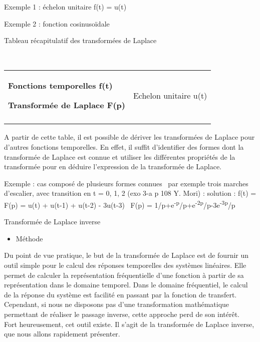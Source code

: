 \documentclass[]{article}
\begin{document}
Exemple 1 : échelon unitaire f(t) = u(t)

Exemple 2 : fonction cosinusoïdale

Tableau récapitulatif des transformées de Laplace

~~ ~ ~

\begin{longtable}[c]{@{}ll@{}}
\toprule\addlinespace
\begin{minipage}[t]{0.47\columnwidth}\raggedright
\textbf{Fonctions temporelles f(t)}

\textbf{Transformée de Laplace F(p)}
\end{minipage} & \begin{minipage}[t]{0.47\columnwidth}\raggedright
Echelon unitaire u(t)
\end{minipage}
\\\addlinespace
\bottomrule
\end{longtable}

A partir de cette table, il est possible de dériver les transformées de
Laplace pour d'autres fonctions temporelles. En effet, il suffit
d'identifier des formes dont la transformée de Laplace est connue et
utiliser les différentes propriétés de la transformée pour en déduire
l'expression de la transformée de Laplace.

Exemple : cas composé de plusieurs formes connues~ par exemple trois
marches d'escalier, avec transition en t = 0, 1, 2 (exo 3-a p 108 Y.
Mori) : solution : f(t) = F(p) = u(t) + u(t-1) + u(t-2) - 3u(t-3)~ F(p)
=
1/p+e\textsuperscript{-p}/p+e\textsuperscript{-2p}/p-3e\textsuperscript{-3p}/p

Transformée de Laplace inverse

\begin{itemize}
\itemsep1pt\parskip0pt
\item
  Méthode
\end{itemize}

Du point de vue pratique, le but de la transformée de Laplace est de
fournir un outil simple pour le calcul des réponses temporelles des
systèmes linéaires. Elle permet de calculer la représentation
fréquentielle d'une fonction à partir de sa représentation dans le
domaine temporel. Dans le domaine fréquentiel, le calcul de la réponse
du système est facilité en passant par la fonction de transfert.
Cependant, si nous ne disposons pas d'une transformation mathématique
permettant de réaliser le passage inverse, cette approche perd de son
intérêt.~ Fort heureusement, cet outil existe. Il s'agit de la
transformée de Laplace inverse, que nous allons rapidement présenter.~
\end{document}
